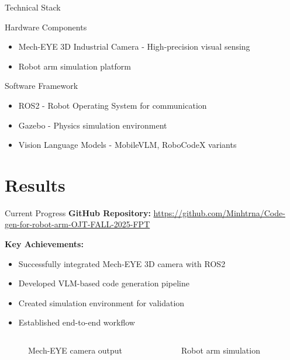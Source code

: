 \documentclass{beamer}
\begin{document}
\begin{frame}{Technical Stack}
    \begin{block}{Hardware Components}
        \begin{itemize}
            \item \alert{Mech-EYE 3D Industrial Camera} - High-precision visual sensing
            \item Robot arm simulation platform
        \end{itemize}
    \end{block}
    
    \begin{block}{Software Framework}
        \begin{itemize}
            \item \alert{ROS2} - Robot Operating System for communication
            \item \alert{Gazebo} - Physics simulation environment  
            \item \alert{Vision Language Models} - MobileVLM, RoboCodeX variants
        \end{itemize}
    \end{block}
    
\end{frame}
                                
\section{Results} 
            
\begin{frame}{Current Progress}
    \textbf{GitHub Repository:} \url{https://github.com/Minhtrna/Code-gen-for-robot-arm-OJT-FALL-2025-FPT}
                                                                
    \textbf{Key Achievements:}
    \begin{itemize}
        \item Successfully integrated Mech-EYE 3D camera with ROS2
        \item Developed VLM-based code generation pipeline
        \item Created simulation environment for validation
        \item Established end-to-end workflow
    \end{itemize}
    
    \begin{columns}
        \begin{figure}
            \centering
            \caption{Mech-EYE camera output}
        \end{figure}	
        \begin{figure}
            \centering
            \caption{Robot arm simulation}
        \end{figure}
    \end{columns}
\end{frame}
\end{document}
